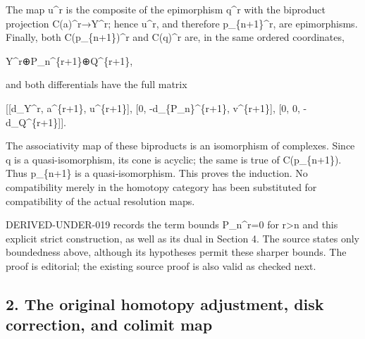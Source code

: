 \documentclass[11pt]{article}
\begin{document}
The map u\^{}r is the composite of the epimorphism q\^{}r with the biproduct projection C(a)\allowbreak{}\textasciicircum{}r\allowbreak{}→Y\textasciicircum{}r; hence u\textasciicircum{}r,\allowbreak{} and therefore p\_\allowbreak{}\{n\allowbreak{}+1\}\textasciicircum{}r,\allowbreak{} are epimorphisms. Finally,\allowbreak{} both C(p\_\allowbreak{}\{n\allowbreak{}+1\})\allowbreak{}\textasciicircum{}r and C(q)\allowbreak{}\textasciicircum{}r are,\allowbreak{} in the same ordered coordinates,\allowbreak{}

Y\textasciicircum{}r\allowbreak{}⊕P\_\allowbreak{}n\textasciicircum{}\{r\allowbreak{}+1\}\allowbreak{}⊕Q\textasciicircum{}\{r\allowbreak{}+1\},\allowbreak{}

and both differentials have the full matrix

[[d\_\allowbreak{}Y\textasciicircum{}r,\allowbreak{} a\textasciicircum{}\{r\allowbreak{}+1\},\allowbreak{} u\textasciicircum{}\{r\allowbreak{}+1\}]\allowbreak{},\allowbreak{} [0,\allowbreak{} -d\_\allowbreak{}\{P\_\allowbreak{}n\}\textasciicircum{}\{r\allowbreak{}+1\},\allowbreak{} v\textasciicircum{}\{r\allowbreak{}+1\}]\allowbreak{},\allowbreak{} [0,\allowbreak{} 0,\allowbreak{} -d\_\allowbreak{}Q\textasciicircum{}\{r\allowbreak{}+1\}]\allowbreak{}]\allowbreak{}.

The associativity map of these biproducts is an isomorphism of complexes. Since q is a quasi-isomorphism,\allowbreak{} its cone is acyclic; the same is true of C(p\_\allowbreak{}\{n\allowbreak{}+1\})\allowbreak{}. Thus p\_\allowbreak{}\{n\allowbreak{}+1\} is a quasi-isomorphism. This proves the induction. No compatibility merely in the homotopy category has been substituted for compatibility of the actual resolution maps.

DERIVED-UNDER-019 records the term bounds P\_\allowbreak{}n\textasciicircum{}r\allowbreak{}=0 for r\textgreater n and this explicit strict construction,\allowbreak{} as well as its dual in Section 4. The source states only boundedness above,\allowbreak{} although its hypotheses permit these sharper bounds. The proof is editorial; the existing source proof is also valid as checked next.

\subsection{\texorpdfstring{2. The original homotopy adjustment,\allowbreak{} disk correction,\allowbreak{} and colimit map}{2. The original homotopy  disk  and colimit map}}\label{proofs-9206-9744-the-original-homotopy-adjustment-disk-correction-and-colimit-map}
\end{document}
